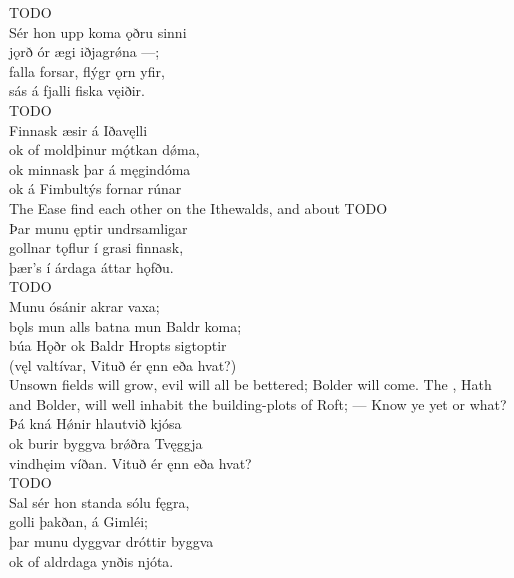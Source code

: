 \bvb TODO\\%

\bva Sér hon upp koma \hld ǫðru sinni \\%
jǫrð ór ægi \hld iðjagrǿna —; \\%
falla forsar, \hld flýgr ǫrn yfir, \\%
sás á fjalli \hld fiska vęiðir.\\%

\bvb TODO\\%

\bva Finnask æsir \hld á Iðavęlli \\%
ok of moldþinur \hld mǫ́tkan dǿma, \\%
ok minnask þar \hld á męgindóma \\%
ok á Fimbultýs \hld fornar rúnar\\%

\bvb The Ease find each other on the Ithewalds, and about TODO\\%

\bva Þar munu ęptir \hld undrsamligar \\%
gollnar tǫflur \hld í grasi finnask, \\%
þær’s í árdaga \hld áttar hǫfðu.\\%

\bvb TODO\\%

\bva Munu ósánir \hld akrar vaxa; \\%
bǫls mun alls batna \hld mun Baldr koma; \\%
búa Hǫðr ok Baldr \hld Hropts sigtoptir \\%
(vęl valtívar, \hld Vituð ér ęnn eða hvat?)\\%

\bvb Unsown fields will grow, evil will all be bettered; Bolder will come. The , Hath and Bolder, will well inhabit the building-plots of Roft; — Know ye yet or what?\\%

\bva Þá kná Hǿnir \hld hlautvið kjósa \\%
ok burir byggva \hld brǿðra Tvęggja \\%
vindhęim víðan. \hld Vituð ér ęnn eða hvat?\\%

\bvb TODO\\%

\bva Sal sér hon standa \hld sólu fęgra, \\%
golli þakðan, \hld á Gimléi; \\%
þar munu dyggvar \hld dróttir byggva \\%
ok of aldrdaga \hld ynðis njóta.\\%

